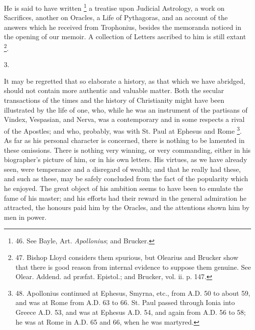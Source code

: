 He is said to have written \footnote{46.
See Bayle, Art. \emph{Apollonius}; and Brucker.} a treatise upon Judicial Astrology, a work on Sacrifices,
another on Oracles, a Life of Pythagoras, and an account of the
answers which he received from Trophonius, besides the memoranda
noticed in the opening of our memoir. A collection of Letters ascribed
to him is still extant \footnote{47.
Bishop Lloyd considers them spurious, but Olearius and Brucker show
that there is good reason from internal evidence to suppose them
genuine. See Olear. Addend. ad præfat. Epistol.; and Brucker, vol.
ii. p. 147.}.

3.

It may be regretted that so
elaborate a history, as that which we have abridged, should not
contain more authentic and valuable matter. Both the secular
transactions of the times and the history of Christianity might have
been illustrated by the life of one, who, while he was an instrument
of the partisans of Vindex, Vespasian, and Nerva, was a contemporary
and in some respects a rival of the Apostles; and who, probably, was
with St. Paul at Ephesus and Rome \footnote{48.
Apollonius continued at Ephesus, Smyrna, etc., from A.D. 50 to about 59, and was at Rome from A.D.
63 to 66. St. Paul passed through Ionia into Greece A.D.
53, and was at Ephesus A.D. 54, and again
from A.D.
56 to 58; he was at Rome in A.D.
65 and 66, when he was martyred.}. As far as his personal character is concerned, there is
nothing to be lamented in these omissions. There is nothing very
winning, or very commanding, either in his biographer's picture of
him, or in his own letters. His virtues, as we have already seen, were
temperance and a disregard of wealth; and that he really had these,
and such as these, may be safely concluded from the fact of the
popularity which he enjoyed. The great object of his ambition seems to
have been to emulate the fame of his master; and his efforts had their
reward in the general admiration he attracted, the honours paid him by
the Oracles, and the attentions shown him by men in power.

